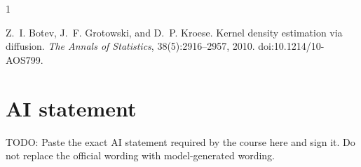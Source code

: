 \documentclass{article}
\begin{document}



\begin{thebibliography}{1}

Z.~I. Botev, J.~F. Grotowski, and D.~P. Kroese.
\newblock Kernel density estimation via diffusion.
\newblock \emph{The Annals of Statistics},
  38(5):2916--2957, 2010.
\newblock doi:10.1214/10-AOS799.

\end{thebibliography}



\newpage
\section*{AI statement}

TODO: Paste the exact AI statement required by the course here and sign
it. Do not replace the official wording with model-generated wording.
\end{document}
